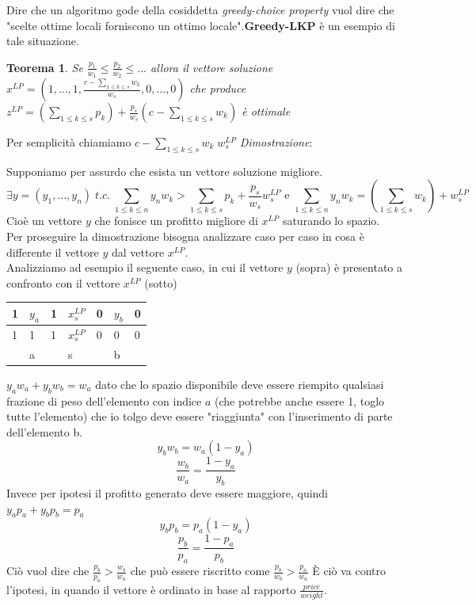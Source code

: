 \documentclass[a4paper]{article}
\newtheorem*{theorem}{Teorema}
\newenvironment{dimostrazione}{\textit{Dimostrazione}:\begin{adjustwidth}{1cm}{}}{\end{adjustwidth}}
\begin{document}
Dire che un algoritmo gode della cosiddetta \textit{greedy-choice property} vuol dire che "scelte ottime locali forniscono un ottimo locale".\textbf{Greedy-LKP} è un esempio di tale situazione.
\begin{theorem}
	Se $\frac{p_1}{w_1} \leq \frac{p_2}{w_2} \leq ...$ allora il vettore soluzione 
	$x^{LP}= (1, ... ,1,\frac{c- \sum_{1 \leq k \leq s}w_k}{w_s} ,0, ... ,0)$ che produce
	$z^{LP} = (\sum_{1 \leq k \leq s} p_k)+\frac{p_s}{w_s}(c- \sum_{1 \leq k \leq s}w_k)$ è ottimale 
\end{theorem}
Per semplicità chiamiamo $c- \sum_{1 \leq k \leq s}w_k \; w_s^{LP}$
\begin{dimostrazione}
	Supponiamo per assurdo che esista un vettore soluzione migliore.
	$$ \exists y =(y_1, ..., y_n) \; t.c. \; \sum_{1 \leq k \leq n}y_nw_k > \sum_{1 \leq k \leq s} p_k+\frac{p_s}{w_s}w_s^{LP} \text{ e }\sum_{1 \leq k \leq n}y_nw_k = (\sum_{1 \leq k \leq s}w_k)+ w_s^{LP}  $$
	Cioè un vettore $y$ che fonisce un profitto migliore di $x^{LP}$ saturando lo spazio.\\
	Per proseguire la dimostrazione bisogna analizzare caso per caso in cosa è differente il vettore $y$ dal vettore $x^{LP}$.\\
	Analizziamo ad esempio il seguente caso, in cui il vettore $y$ (sopra) è presentato a confronto con il vettore $x^{LP}$ (sotto)
	\begin{table}[!ht]
		\centering
\begin{tabular}{lllllll}
\hline
\multicolumn{1}{|l|}{1} & \multicolumn{1}{l|}{$y_a$} & \multicolumn{1}{l|}{1} & \multicolumn{1}{l|}{$x_s^{LP}$} & \multicolumn{1}{l|}{0} & \multicolumn{1}{l|}{$y_b$} & \multicolumn{1}{l|}{0} \\ \hline
\multicolumn{1}{|l|}{1} & \multicolumn{1}{l|}{1}    & \multicolumn{1}{l|}{1} & \multicolumn{1}{l|}{$x_s^{LP}$} & \multicolumn{1}{l|}{0} & \multicolumn{1}{l|}{0}    & \multicolumn{1}{l|}{0} \\ \hline
                        & a                         &                        & s                                                 &                        & b                         &                       
\end{tabular}
\end{table}
$y_aw_a +  y_bw_b = w_a$ dato che lo spazio disponibile deve essere riempito qualsiasi frazione di peso dell'elemento con indice $a$ (che potrebbe anche essere 1, toglo tutte l'elemento) che io tolgo deve essere "riaggiunta" con l'inserimento di parte dell'elemento b.
$$y_bw_b=w_a(1-y_a)$$
$$\frac{w_b}{w_a}=\frac{1-y_a}{y_b}$$
Invece per ipotesi il profitto generato deve essere maggiore, quindi $y_ap_a +  y_bp_b = p_a$
$$y_bp_b=p_a(1-y_a)$$
$$\frac{p_b}{p_a}=\frac{1-p_a}{p_b}$$
Ciò vuol dire che $\frac{p_b}{p_a} > \frac{w_b}{w_a}$ che può essere riscritto come $\frac{p_b}{w_b} > \frac{p_a}{w_a}$%
È ciò va contro l'ipotesi, in quando il vettore è ordinato in base al rapporto $\frac{price}{weight}$.
\end{dimostrazione}
\end{document}
